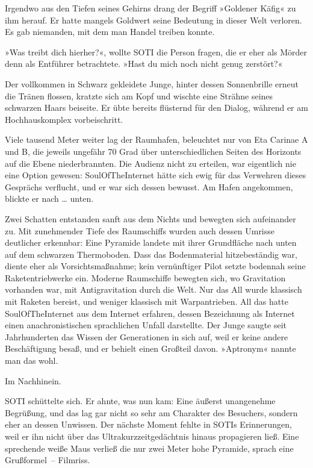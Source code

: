 Irgendwo aus den Tiefen seines Gehirns drang der Begriff »Goldener Käfig« zu ihm herauf. Er hatte mangels Goldwert seine Bedeutung in dieser Welt verloren. Es gab niemanden, mit dem man Handel treiben konnte.

»Was treibt dich hierher?«, wollte SOTI die Person fragen, die er eher als Mörder denn als Entführer betrachtete. »Hast du mich noch nicht genug zerstört?«

Der vollkommen in Schwarz gekleidete Junge, hinter dessen Sonnenbrille erneut die Tränen flossen, kratzte sich am Kopf und wischte eine Strähne seines schwarzen Haars beiseite. Er übte bereits flüsternd für den Dialog, während er am Hochhauskomplex vorbeischritt.

Viele tausend Meter weiter lag der Raumhafen, beleuchtet nur von Eta Carinae A und B, die jeweils ungefähr 70 Grad über unterschiedlichen Seiten des Horizonts auf die Ebene niederbrannten. Die Audienz nicht zu erteilen, war eigentlich nie eine Option gewesen: SoulOfTheInternet hätte sich ewig für das Verwehren dieses Gesprächs verflucht, und er war sich dessen bewusst. Am Hafen angekommen, blickte er nach … unten.

Zwei Schatten entstanden sanft aus dem Nichts und bewegten sich aufeinander zu. Mit zunehmender Tiefe des Raumschiffs wurden auch dessen Umrisse deutlicher erkennbar: Eine Pyramide landete mit ihrer Grundfläche nach unten auf dem schwarzen Thermoboden. Dass das Bodenmaterial hitzebeständig war, diente eher als Vorsichtsmaßnahme; kein vernünftiger Pilot setzte bodennah seine Raketentriebwerke ein. Moderne Raumschiffe bewegten sich, wo Gravitation vorhanden war, mit Antigravitation durch die Welt. Nur das All wurde klassisch mit Raketen bereist, und weniger klassisch mit Warpantrieben. All das hatte SoulOfTheInternet aus dem Internet erfahren, dessen Bezeichnung als Internet einen anachronistischen sprachlichen Unfall darstellte. Der Junge saugte seit Jahrhunderten das Wissen der Generationen in sich auf, weil er keine andere Beschäftigung besaß, und er behielt einen Großteil davon. »Aptronym« nannte man das wohl.

Im Nachhinein.

SOTI schüttelte sich. Er ahnte, was nun kam: Eine äußerst unangenehme Begrüßung, und das lag gar nicht so sehr am Charakter des Besuchers, sondern eher an dessen Unwissen. Der nächste Moment fehlte in SOTIs Erinnerungen, weil er ihn nicht über das Ultrakurzzeitgedächtnis hinaus propagieren ließ. Eine sprechende weiße Maus verließ die nur zwei Meter hohe Pyramide, sprach eine Grußformel~– Filmriss.

